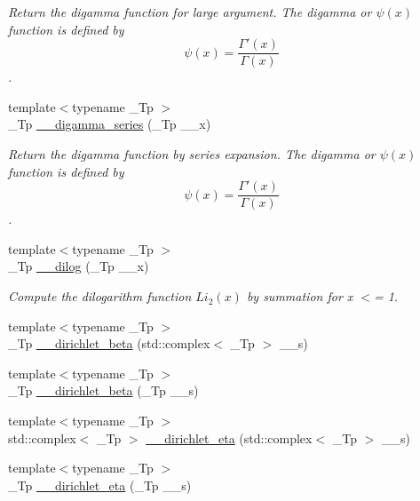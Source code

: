 \begin{DoxyCompactItemize}
\begin{DoxyCompactList}\small\item\em Return the digamma function for large argument. The digamma or $ \psi(x) $ function is defined by \[ \psi(x) = \frac{\Gamma'(x)}{\Gamma(x)} \]. \end{DoxyCompactList}\item 
{\footnotesize template$<$typename \+\_\+\+Tp $>$ }\\\+\_\+\+Tp \hyperlink{namespacestd_1_1____detail_ae9d54f73a3e05c2b242e992a0a93d5de}{\+\_\+\+\_\+digamma\+\_\+series} (\+\_\+\+Tp \+\_\+\+\_\+x)
\begin{DoxyCompactList}\small\item\em Return the digamma function by series expansion. The digamma or $ \psi(x) $ function is defined by \[ \psi(x) = \frac{\Gamma'(x)}{\Gamma(x)} \]. \end{DoxyCompactList}\item 
{\footnotesize template$<$typename \+\_\+\+Tp $>$ }\\\+\_\+\+Tp \hyperlink{namespacestd_1_1____detail_a5083a0c9fce3299593ca22e7dbaeaf19}{\+\_\+\+\_\+dilog} (\+\_\+\+Tp \+\_\+\+\_\+x)
\begin{DoxyCompactList}\small\item\em Compute the dilogarithm function $ Li_2(x) $ by summation for x $<$= 1. \end{DoxyCompactList}\item 
{\footnotesize template$<$typename \+\_\+\+Tp $>$ }\\\+\_\+\+Tp \hyperlink{namespacestd_1_1____detail_ad0c8e975438d30cbfb5cad91f3ac6d01}{\+\_\+\+\_\+dirichlet\+\_\+beta} (std\+::complex$<$ \+\_\+\+Tp $>$ \+\_\+\+\_\+s)
\item 
{\footnotesize template$<$typename \+\_\+\+Tp $>$ }\\\+\_\+\+Tp \hyperlink{namespacestd_1_1____detail_a2e4243f8d092d48e16fc45ba0c4e9489}{\+\_\+\+\_\+dirichlet\+\_\+beta} (\+\_\+\+Tp \+\_\+\+\_\+s)
\item 
{\footnotesize template$<$typename \+\_\+\+Tp $>$ }\\std\+::complex$<$ \+\_\+\+Tp $>$ \hyperlink{namespacestd_1_1____detail_a3d8d694bf430ca3959c9e6b00c332468}{\+\_\+\+\_\+dirichlet\+\_\+eta} (std\+::complex$<$ \+\_\+\+Tp $>$ \+\_\+\+\_\+s)
\item 
{\footnotesize template$<$typename \+\_\+\+Tp $>$ }\\\+\_\+\+Tp \hyperlink{namespacestd_1_1____detail_a88be5bbcdf85bbc487b6b86b5cb65d98}{\+\_\+\+\_\+dirichlet\+\_\+eta} (\+\_\+\+Tp \+\_\+\+\_\+s)

\end{DoxyCompactItemize}
